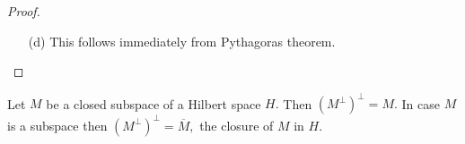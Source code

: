 \begin{proof}
\begin{itemize}
	    Now taking sums and rearranging, we have that
	    \begin{equation*}
		\underbrace{Px_{1} + Px_{2} - P\left( x_{1} + x_{2} \right)}_{\in M} = \underbrace{Q\left( x_{1} + x_{2} \right) - Qx_{1} - Qx_{2}}_{\in M^{\perp}}
	    \end{equation*}
	    Since $M \cap M^{\perp} = \left\{ 0 \right\}$, the linearity of $P$ and $Q$ follows.

	    Now, let $x\in P$. We need to prove that $P^{2}x = Px$. Now note that $Px \in M$. Thus by part (a) we have
	    \begin{equation*}
		Px = P^{2} x + QPx
	    \end{equation*}
	    By uniqueness of part (a), we must have that $Px = P^{2}x$. This completes the proof. $Q^{2}= Q$ can be proved similarly.

	\item [(d)] This follows immediately from Pythagoras theorem.
    \end{itemize}
\end{proof}

\begin{corollary}
Let $M$ be a closed subspace of a Hilbert space $H.$ Then $(M^{\perp})^{\perp} = M.$ In case $M$ is a subspace then $(M^{\perp})^{\perp} = \overline{M},$ the closure of $M$ in $H.$
\end{corollary}



